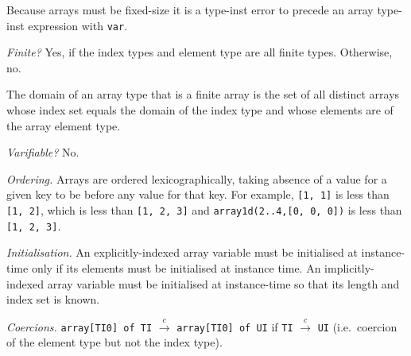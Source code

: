\documentclass[10pt]{scrartcl}
\newcommand{\pjs}[1]{\textcolor{blue}{PJS:#1}}
\newcommand{\TyThing}[1]{\vspace{1.2mm}\noindent\emph{#1} }
\newcommand{\TyFiniteType}{\TyThing{Finite?}}
\newcommand{\TyVarifiable}{\TyThing{Varifiable?}}
\newcommand{\TyOrdering}{\TyThing{Ordering.}}
\newcommand{\TyInit}{\TyThing{Initialisation.}}
\newcommand{\TyCoercions}{\TyThing{Coercions.}}
\newcommand{\coerce}[2]{#1 $\stackrel{c}{\rightarrow}$ #2}
\begin{document}
Because arrays must be fixed-size it is a type-inst error to precede an
array type-inst expression with \texttt{var}.


\TyFiniteType
Yes, if the index types and element type are all finite types.
Otherwise, no.

The domain of an array type that is a finite array is the set of all
distinct arrays whose index set equals the domain of the index type
and whose elements are of the array element type.

\TyVarifiable
No.

\TyOrdering
Arrays are ordered lexicographically, taking absence of a value for a given key
to be before any value for that key.  For example,
\texttt{[1, 1]} is less than
\texttt{[1, 2]}, which is less than \texttt{[1, 2, 3]} and
\texttt{array1d(2..4,[0, 0, 0])} is less than \texttt{[1, 2, 3]}.

\TyInit
An explicitly-indexed array variable must be initialised at instance-time
only if its elements must be initialised at instance time.
An implicitly-indexed array variable must be initialised at instance-time
so that its length and index set is known.

\TyCoercions
\coerce{\texttt{array[TI0] of TI}}{\texttt{array[TI0] of UI}}
if \coerce{\texttt{TI}}{\texttt{UI}} (i.e.\ coercion of the element type
but not the index type).
\end{document}
